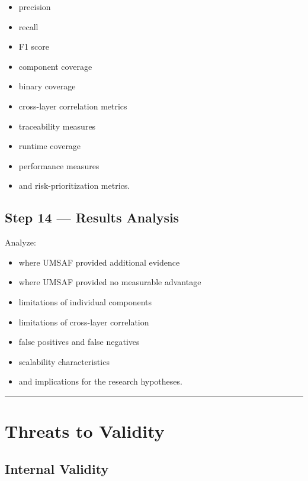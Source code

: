\documentclass[
  12pt,
  letterpaper,
  oneside]{report}
\providecommand{\tightlist}{%
  \setlength{\itemsep}{0pt}\setlength{\parskip}{0pt}}
\begin{document}
\begin{itemize}
\tightlist
\item
  precision
\item
  recall
\item
  F1 score
\item
  component coverage
\item
  binary coverage
\item
  cross-layer correlation metrics
\item
  traceability measures
\item
  runtime coverage
\item
  performance measures
\item
  and risk-prioritization metrics.
\end{itemize}

\subsection{Step 14 --- Results
Analysis}\label{step-14--results-analysis}

Analyze:

\begin{itemize}
\tightlist
\item
  where UMSAF provided additional evidence
\item
  where UMSAF provided no measurable advantage
\item
  limitations of individual components
\item
  limitations of cross-layer correlation
\item
  false positives and false negatives
\item
  scalability characteristics
\item
  and implications for the research hypotheses.
\end{itemize}

\begin{center}\rule{0.5\linewidth}{0.5pt}\end{center}

\section{Threats to Validity}\label{118-threats-to-validity}

\subsection{Internal Validity}\label{1181-internal-validity}
\end{document}
